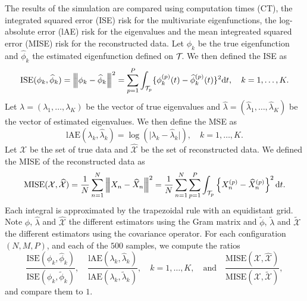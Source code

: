 The results of the simulation are compared using computation times (CT), the integrated squared error (ISE) risk for the multivariate eigenfunctions, the log-absolute error (lAE) risk for the eigenvalues and the mean integreated squared error (MISE) risk for the reconstructed data. Let $\phi_k$ be the true eigenfunction and $\widehat{\phi}_k$ the estimated eigenfunction defined on $\mathcal{T}_{}$. We then defined the ISE as 
\begin{equation}\label{eq:ise_eigenfunctions}
    \text{ISE}(\phi_k, \widehat{\phi}_k) = \left|\!\left|\!\left|\phi_k - \widehat{\phi}_k\right|\!\right|\!\right|^2 = \sum_{p = 1}^P \int_{\mathcal{T}_{p}} \{\phi^{(p)}_k(t) - \widehat{\phi}^{(p)}_k(t)\}^2 {\rm d} t, \quad k = 1, \dots, K.
\end{equation}
Let $\lambda = (\lambda_1, \dots, \lambda_K)$ be the vector of true eigenvalues and $\widehat{\lambda} = (\widehat{\lambda}_1, \dots, \widehat{\lambda}_K)$ be the vector of estimated eigenvalues. We then define the MSE as 
\begin{equation}\label{eq:mse_eigenvalues}
    \text{lAE}(\lambda_k, \widehat{\lambda}_k) = \log(\lvert \lambda_k - \widehat{\lambda}_k\rvert), \quad k = 1, \dots, K.
\end{equation}
Let $\mathcal{X}$ be the set of true data and $\widehat{\mathcal{X}}$ be the set of reconstructed data. We defined the MISE of the reconstructed data as
\begin{equation}\label{eq:mise_reconstructed_data}
    \text{MISE}(\mathcal{X}, \widehat{\mathcal{X}}) = \frac{1}{N}\sum_{n = 1}^N \left|\!\left|\!\left|X_n - \widehat{X}_n\right|\!\right|\!\right|^2 = \frac{1}{N}\sum_{n = 1}^N \sum_{p = 1}^P \int_{\mathcal{T}_{p}} \left\{X_n^{(p)} - \widehat{X}_n^{(p)} \right\}^2 {\rm d} t.
\end{equation}
Each integral is approximated by the trapezoidal rule with an equidistant grid. Note $\widehat{\phi}$, $\widehat{\lambda}$ and $\widehat{\mathcal{X}}$ the different estimators using the Gram matrix and $\widetilde{\phi}$, $\widetilde{\lambda}$ and $\widetilde{\mathcal{X}}$ the different estimators using the covariance operator. For each configuration $(N, M, P)$, and each of the $500$ samples, we compute the ratios
\begin{equation}
    \frac{\text{ISE}(\phi_k, \widehat{\phi}_k)}{\text{ISE}(\phi_k, \widetilde{\phi}_k)}, \quad \frac{\text{lAE}(\lambda_k, \widehat{\lambda}_k)}{\text{lAE}(\lambda_k, \widetilde{\lambda}_k)},\quad k = 1, \dots, K, \quad\text{and}\quad \frac{\text{MISE}(\mathcal{X}, \widehat{\mathcal{X}})}{\text{MISE}(\mathcal{X}, \widetilde{\mathcal{X}})},
\end{equation}
and compare them to $1$.

